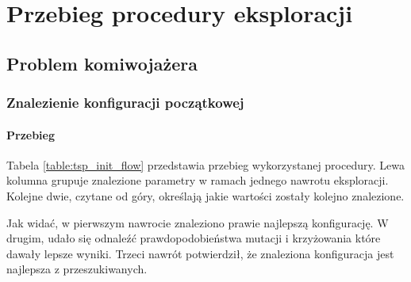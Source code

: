 \documentclass[./FM_mgr.tex]{subfiles}
\begin{document}
\appendix
\chapter{Przebieg procedury eksploracji} \label{appendix:explore-flow}

\section{Problem komiwojażera}

\subsection{Znalezienie konfiguracji początkowej}

\subsubsection{Przebieg}

Tabela \ref{table:tsp_init_flow} przedstawia przebieg wykorzystanej procedury. 
Lewa kolumna grupuje znalezione parametry w ramach jednego nawrotu eksploracji. 
Kolejne dwie, czytane od góry, określają jakie wartości zostały kolejno znalezione.

Jak widać, w pierwszym nawrocie znaleziono prawie najlepszą konfigurację. 
W drugim, udało się odnaleźć prawdopodobieństwa mutacji i krzyżowania które dawały lepsze wyniki.
Trzeci nawrót potwierdził, że znaleziona konfiguracja jest najlepsza z przeszukiwanych.
\end{document}

